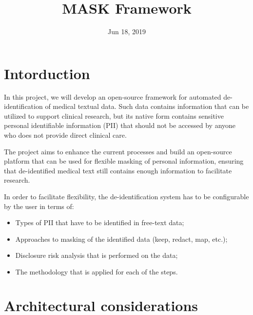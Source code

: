 \documentclass[letterpaper,10pt,english]{sphinxmanual}
\title{MASK Framework}
\date{Jun 18, 2019}
\author{}
\begin{document}
\pagestyle{empty}
\sphinxmaketitle
\pagestyle{plain}
\sphinxtableofcontents
\pagestyle{normal}
\label{\detokenize{contents::doc}}



\chapter{Intorduction}
\label{\detokenize{contents:intorduction}}

In this project, we will develop an open-source framework for automated de-identification of medical textual data. Such data contains information that can be utilized to support clinical research, but its native form contains sensitive personal identifiable information (PII) that should not be accessed by anyone who does not provide direct clinical care.

The project aims to enhance the current processes and build an open-source platform that can be used for flexible masking of personal information, ensuring that de-identified medical text still contains enough information to facilitate research.

In order to facilitate flexibility, the de-identification system has to be configurable by the user in terms of:
\begin{itemize}
\item {} 
Types of PII that have to be identified in free-text data;

\item {} 
Approaches to masking of the identified data (keep, redact, map, etc.);

\item {} 
Disclosure risk analysis that is performed on the data;

\item {} 
The methodology that is applied for each of the steps.

\end{itemize}


\chapter{Architectural considerations}
\label{\detokenize{contents:architectural-considerations}}
\end{document}
